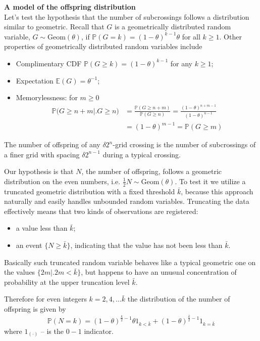 \documentclass[a4paper]{report}
\newcommand{\pr}{\mathbb{P}}
\begin{document}
\noindent \textbf{A model of the offspring distribution} \hfill \\

Let's test the hypothesis that the number of subcrossings follows a distribution
similar to geometric. Recall that $G$ is a geometrically distributed random variable,
$G\sim \text{Geom}(\theta)$, if $\mathbb{P}(G=k) = {(1-\theta)}^{k-1}\theta$ for all
$k\geq1$. Other properties of geometrically distributed random variables include
\begin{itemize}
	\item Complimentary CDF $\mathbb{P}(G\geq k) = (1-\theta)^{k-1}$ for any $k\geq1$;
	\item Expectation $\mathbb{E}(G) = \theta^{-1}$;
	\item Memorylessness: for $m\geq 0$
	\begin{align*}
		\pr\bigl( G \geq n + m \bigr\rvert\bigl. G \geq n \bigr)
		&= \frac{\pr(G \geq n+m)}{\pr(G \geq n)} = \frac{(1-\theta)^{n+m-1}}{(1-\theta)^{n-1}} \\
		& = (1-\theta)^{m-1} = \pr(G \geq m)
	\end{align*}
\end{itemize}

The number of offspring of any $\delta 2^n$-grid crossing is the number of subcrossings
of a finer grid with spacing $\delta 2^{n-1}$ during a typical crossing.

Our hypothesis is that $N$, the number of offspring, follows a geometric distribution
on the even numbers, i.e. $\frac{1}{2}N \sim \text{Geom}(\theta)$. To test it we
utilize a truncated geometric distribution with a fixed threshold $\bar{k}$, because
this approach naturally and easily handles unbounded random variables. Truncating the
data effectively means that two kinds of observations are registered:
\begin{itemize}
	\item a value less than $\bar{k}$;
	\item an event $\big\{N\geq \bar{k}\big\}$, indicating that the value has not
	been less than $\bar{k}$.
\end{itemize}
Basically such truncated random variable behaves like a typical geometric one on
the values $\bigl\{ 2m \bigr\rvert \bigl. 2m < \bar{k}\bigr\}$, but happens to have
an unusual concentration of probability at the upper truncation level $\bar{k}$.

Therefore for even integers $k=2,4,\ldots\bar{k}$ the distribution of the number
of offspring is given by
\[
\mathbb{P}(N=k)
= (1-\theta)^{\frac{k}{2}-1} \theta 1_{k<\bar{k}}
+ (1-\theta)^{\frac{\bar{k}}{2}-1} 1_{k = \bar{k}}
\]
where $1_{(\cdot)}$ -- is the $0-1$ indicator.
\end{document}
